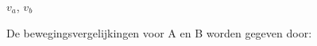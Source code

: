 \documentclass{ximera}
\begin{document}
\begin{exercise}[gevraagd]$v_a$, $v_b$
\end{exercise}

\begin{exercise}[oplossing]De bewegingsvergelijkingen voor A en B worden gegeven door:


\end{exercise}
\end{document}
